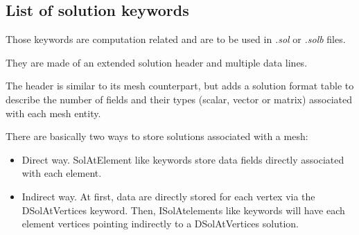 \documentclass[a4paper,12pt]{article}
\begin{document}
\subsection{List of solution keywords}

Those keywords are computation related and are to be used in \emph{.sol} or \emph{.solb} files.

They are made of an extended solution header and multiple data lines.

The header is similar to its mesh counterpart, but adds a solution format table to describe the number of fields and their types (scalar, vector or matrix) associated with each mesh entity.

There are basically two ways to store solutions associated with a mesh:

\begin{itemize}
\item Direct way. SolAtElement like keywords store data fields directly associated with each element.
\item Indirect way. At first, data are directly stored for each vertex via the DSolAtVertices keyword. Then, ISolAtelements like keywords will have each element vertices pointing indirectly to a DSolAtVertices solution.
\end{itemize}
\end{document}
